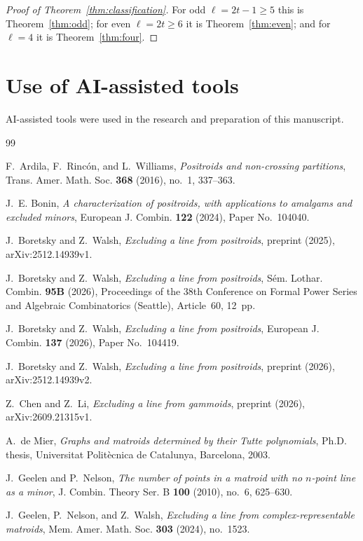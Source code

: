\documentclass[11pt]{amsart}
\theoremstyle{definition}
\theoremstyle{remark}
\numberwithin{equation}{section}
\begin{document}
\begin{proof}[Proof of Theorem~\ref{thm:classification}]
For odd $\ell=2t-1\ge5$ this is Theorem~\ref{thm:odd}; for even $\ell=2t\ge6$ it is Theorem~\ref{thm:even}; and for $\ell=4$ it is Theorem~\ref{thm:four}.
\end{proof}

\section*{Use of AI-assisted tools}
AI-assisted tools were used in the research and preparation of this manuscript.

\begin{thebibliography}{99}

 F.~Ardila, F.~Rinc\'on, and L.~Williams, \emph{Positroids and non-crossing partitions}, Trans. Amer. Math. Soc. \textbf{368} (2016), no.~1, 337--363.

 J.~E. Bonin, \emph{A characterization of positroids, with applications to amalgams and excluded minors}, European J. Combin. \textbf{122} (2024), Paper No.~104040.

 J.~Boretsky and Z.~Walsh, \emph{Excluding a line from positroids}, preprint (2025), arXiv:2512.14939v1.

 J.~Boretsky and Z.~Walsh, \emph{Excluding a line from positroids}, S\'em. Lothar. Combin. \textbf{95B} (2026), Proceedings of the 38th Conference on Formal Power Series and Algebraic Combinatorics (Seattle), Article~60, 12~pp.

 J.~Boretsky and Z.~Walsh, \emph{Excluding a line from positroids}, European J. Combin. \textbf{137} (2026), Paper No.~104419.

 J.~Boretsky and Z.~Walsh, \emph{Excluding a line from positroids}, preprint (2026), arXiv:2512.14939v2.

 Z.~Chen and Z.~Li, \emph{Excluding a line from gammoids}, preprint (2026), arXiv:2609.21315v1.

 A.~de Mier, \emph{Graphs and matroids determined by their Tutte polynomials}, Ph.D. thesis, Universitat Polit\`ecnica de Catalunya, Barcelona, 2003.

 J.~Geelen and P.~Nelson, \emph{The number of points in a matroid with no $n$-point line as a minor}, J. Combin. Theory Ser. B \textbf{100} (2010), no.~6, 625--630.

 J.~Geelen, P.~Nelson, and Z.~Walsh, \emph{Excluding a line from complex-representable matroids}, Mem. Amer. Math. Soc. \textbf{303} (2024), no.~1523.


\end{thebibliography}
\end{document}
